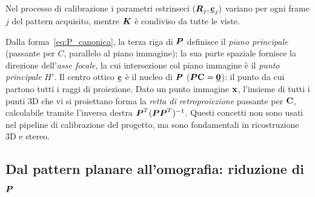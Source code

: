 \begin{oss}
Nel processo di calibrazione i parametri estrinseci \((\boldsymbol{R}_j, \underline{\mathbf{c}}_j)\)
variano per ogni frame \(j\) del pattern acquisito, mentre \(\boldsymbol{K}\)
è condiviso da tutte le viste.
\end{oss}

\begin{oss}
Dalla forma~\eqref{eq:P_canonica}, la terza riga di \(\boldsymbol{P}\) definisce
il \emph{piano principale} (passante per \(C\), parallelo al piano immagine);
la sua parte spaziale fornisce la direzione dell'\emph{asse focale}, la
cui intersezione col piano immagine è il \emph{punto principale} \(H'\).
Il centro ottico \(\underline{\mathbf{c}}\) è il nucleo di \(\boldsymbol{P}\)
(\(\boldsymbol{P}\mathbf{C}=\underline{\mathbf{0}}\)): il punto da cui partono tutti i raggi
di proiezione. Dato un punto immagine \(\mathbf{x}\), l'insieme di tutti
i punti 3D che vi si proiettano forma la \emph{retta di retroproiezione}
passante per \(\mathbf{C}\), calcolabile tramite l'inversa destra
\(\boldsymbol{P}^T(\boldsymbol{P}\boldsymbol{P}^T)^{-1}\). Questi concetti non sono usati
nel pipeline di calibrazione del progetto, ma sono fondamentali in
ricostruzione 3D e stereo.
\end{oss}

\subsection{Dal pattern planare all'omografia: riduzione di \(\boldsymbol{P}\)}
\label{sub:stima_P}

